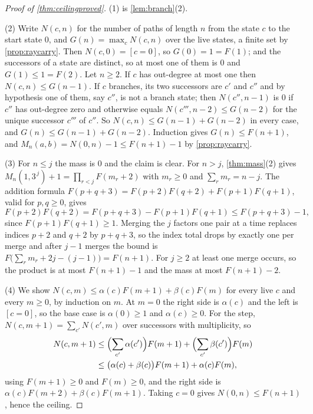 \documentclass[11pt]{amsart}
\theoremstyle{definition}
\theoremstyle{remark}
\begin{document}
\begin{proof}[Proof of \cref{thm:ceilingproved}]
(1) is \cref{lem:branch}(2).

(2) Write $N(c,n)$ for the number of paths of length $n$ from the state $c$ to the start state $0$, and $G(n)=\max_c N(c,n)$ over the live states, a finite set by \cref{prop:raycarry}. Then $N(c,0)=[c=0]$, so $G(0)=1=F(1)$; and the successors of a state are distinct, so at most one of them is $0$ and $G(1)\le 1=F(2)$. Let $n\ge 2$. If $c$ has out-degree at most one then $N(c,n)\le G(n-1)$. If $c$ branches, its two successors are $c'$ and $c''$ and by hypothesis one of them, say $c''$, is not a branch state; then $N(c'',n-1)$ is $0$ if $c''$ has out-degree zero and otherwise equals $N(c''',n-2)\le G(n-2)$ for the unique successor $c'''$ of $c''$. So $N(c,n)\le G(n-1)+G(n-2)$ in every case, and $G(n)\le G(n-1)+G(n-2)$. Induction gives $G(n)\le F(n+1)$, and $M_n(a,b)=N(0,n)-1\le F(n+1)-1$ by \cref{prop:raycarry}.

(3) For $n\le j$ the mass is $0$ and the claim is clear. For $n>j$, \cref{thm:mass}(2) gives $M_n(1,3^{\,j})+1=\prod_{r<j}F(m_r+2)$ with $m_r\ge 0$ and $\sum_r m_r=n-j$. The addition formula $F(p+q+3)=F(p+2)F(q+2)+F(p+1)F(q+1)$, valid for $p,q\ge 0$, gives
\[
F(p+2)F(q+2)=F(p+q+3)-F(p+1)F(q+1)\le F(p+q+3)-1 ,
\]
since $F(p+1)F(q+1)\ge 1$. Merging the $j$ factors one pair at a time replaces indices $p+2$ and $q+2$ by $p+q+3$, so the index total drops by exactly one per merge and after $j-1$ merges the bound is $F\bigl(\sum_r m_r+2j-(j-1)\bigr)=F(n+1)$. For $j\ge 2$ at least one merge occurs, so the product is at most $F(n+1)-1$ and the mass at most $F(n+1)-2$.

(4) We show $N(c,m)\le\alpha(c)F(m+1)+\beta(c)F(m)$ for every live $c$ and every $m\ge 0$, by induction on $m$. At $m=0$ the right side is $\alpha(c)$ and the left is $[c=0]$, so the base case is $\alpha(0)\ge 1$ and $\alpha(c)\ge 0$. For the step, $N(c,m+1)=\sum_{c'}N(c',m)$ over successors with multiplicity, so
\[
\begin{aligned}
N(c,m+1)&\le\Bigl(\sum_{c'}\alpha(c')\Bigr)F(m+1)+\Bigl(\sum_{c'}\beta(c')\Bigr)F(m)\\
&\le\bigl(\alpha(c)+\beta(c)\bigr)F(m+1)+\alpha(c)F(m),
\end{aligned}
\]
using $F(m+1)\ge 0$ and $F(m)\ge 0$, and the right side is $\alpha(c)F(m+2)+\beta(c)F(m+1)$. Taking $c=0$ gives $N(0,n)\le F(n+1)$, hence the ceiling.
\end{proof}
\end{document}
